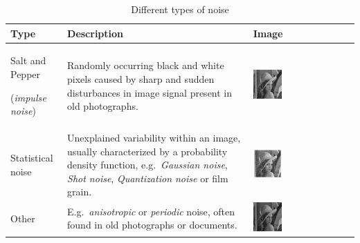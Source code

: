 \begin{table}
{\small
\begin{tabular}{p{8em}p{12em}l}
\toprule
\textbf{Type} & \textbf{Description} & \textbf{Image} \\
\midrule
Salt and Pepper \par (\emph{impulse noise})
&
Randomly occurring black and white pixels caused by sharp and sudden
disturbances in image signal present in old photographs.
&
\includegraphics[width=0.3\textwidth, align=t]{img/preprocessing/noise_saltpepper.png} \\
Statistical noise 
&
Unexplained variability within an image, usually characterized by a probability density function, e.g.~\emph{Gaussian noise}, \emph{Shot noise}, \emph{Quantization noise} or film grain.
&
\includegraphics[width=0.3\textwidth, align=t]{img/preprocessing/noise_gaussian.jpg}\\
Other
&
E.g.~\emph{anisotropic} or \emph{periodic} noise, often found in old photographs or documents.
&
\includegraphics[width=0.3\textwidth, align=t]{img/preprocessing/noise_periodic.jpg} \\
\bottomrule
\end{tabular}
}
\caption{Different types of noise}
\label{tab:preprocessNoiseTypes}
\end{table}

